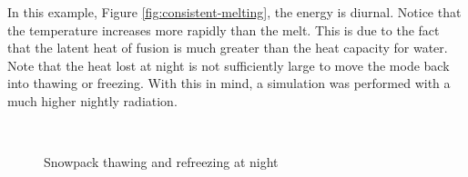 \documentclass{article}
\begin{document}
In this example, Figure \ref{fig:consistent-melting}, the energy is diurnal.
Notice that the temperature increases more rapidly than the melt.
This is due to the fact that the latent heat of fusion is much
greater than the heat capacity for water.
Note that the heat lost at night is not sufficiently large
to move the mode back into thawing or freezing.
With this in mind, a simulation was performed with a much
higher nightly radiation.


\begin{figure}
\centering
\mbox{
 \quad
{}
}
\caption{Snowpack thawing and refreezing at night} \label{fig:refreezing-melt}
\end{figure}
\end{document}
